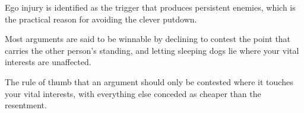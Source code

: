 

\begin{distilled}
  \item Ego injury is identified as the trigger that produces persistent enemies, which is the practical reason for avoiding the clever putdown.
  \item Most arguments are said to be winnable by declining to contest the point that carries the other person's standing, and letting sleeping dogs lie where your vital interests are unaffected.
\end{distilled}

\begin{unique}
  \item The rule of thumb that an argument should only be contested where it touches your vital interests, with everything else conceded as cheaper than the resentment.
\end{unique}
